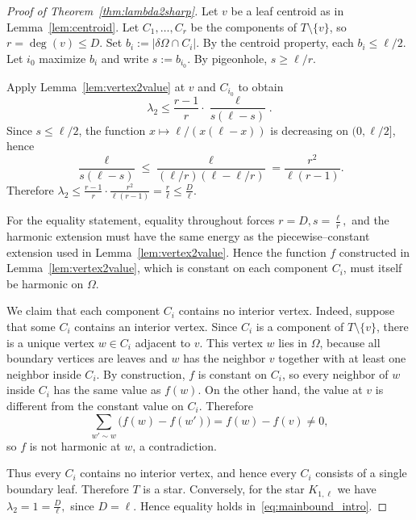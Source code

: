 \documentclass[10pt,a4paper]{amsart}
\newcommand{\Om}{\Omega}
\newcommand{\dO}{\delta\Omega}
\begin{document}
\begin{proof}[Proof of Theorem~\ref{thm:lambda2sharp}]
Let $v$ be a leaf centroid as in Lemma~\ref{lem:centroid}.
Let $C_1,\dots,C_r$ be the components of $T\setminus\{v\}$, so $r=\deg(v)\le D$.
Set $b_i:=|\dO\cap C_i|$.
By the centroid property, each $b_i\le\ell/2$.
Let $i_0$ maximize $b_i$ and write $s:=b_{i_0}$.
By pigeonhole, $s\ge\ell/r$.

Apply Lemma~\ref{lem:vertex2value} at $v$ and $C_{i_0}$ to obtain
$$
\lambda_2\le \frac{r-1}{r}\cdot\frac{\ell}{s(\ell-s)}.
$$
Since $s\le\ell/2$, the function $x\mapsto\ell/(x(\ell-x))$ is decreasing on $(0,\ell/2]$, hence
$$
\frac{\ell}{s(\ell-s)}\le \frac{\ell}{(\ell/r)(\ell-\ell/r)}=\frac{r^2}{\ell(r-1)}.
$$
Therefore $\lambda_2\le \frac{r-1}{r}\cdot\frac{r^2}{\ell(r-1)}=\frac{r}{\ell}\le\frac{D}{\ell}$.

For the equality statement, equality throughout forces
$
r=D, s=\frac{\ell}{r},
$
and the harmonic extension must have the same energy as the piecewise--constant extension used in
Lemma~\ref{lem:vertex2value}. Hence the function $f$ constructed in Lemma~\ref{lem:vertex2value}, which is constant on each component
$C_i$, must itself be harmonic on $\Om$.

We claim that each component $C_i$ contains no interior vertex. Indeed, suppose that some $C_i$
contains an interior vertex. Since $C_i$ is a component of $T\setminus\{v\}$, there is a unique vertex
$w\in C_i$ adjacent to $v$. This vertex $w$ lies in $\Om$, because all boundary vertices are leaves
and $w$ has the neighbor $v$ together with at least one neighbor inside $C_i$. By construction, $f$
is constant on $C_i$, so every neighbor of $w$ inside $C_i$ has the same value as $f(w)$. On the other
hand, the value at $v$ is different from the constant value on $C_i$. Therefore
$$
\sum_{w'\sim w}\bigl(f(w)-f(w')\bigr)=f(w)-f(v)\neq 0,
$$
so $f$ is not harmonic at $w$, a contradiction.

Thus every $C_i$ contains no interior vertex, and hence every $C_i$ consists of a single boundary
leaf. Therefore $T$ is a star. Conversely, for the star $K_{1,\ell}$ we have
$
\lambda_2=1=\frac{D}{\ell},
$
since $D=\ell$. Hence equality holds in~\eqref{eq:mainbound_intro}.
\end{proof}
\end{document}
